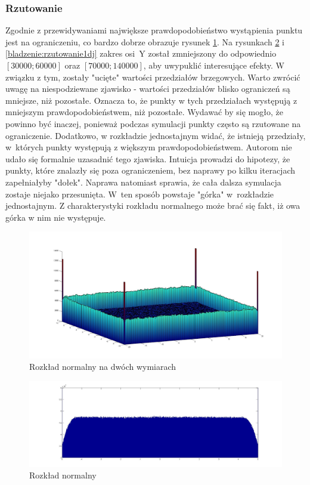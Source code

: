 \documentclass{mini}
\begin{document}
\subsubsection*{Rzutowanie}
Zgodnie z przewidywaniami największe prawdopodobieństwo wystąpienia punktu jest na ograniczeniu, co bardzo dobrze obrazuje rysunek \ref{bladzenie:rzutowanie2d}. Na rysunkach   \ref{bladzenie:rzutowanie1dn} i  \ref{bladzenie:rzutowanie1dj} zakres osi~Y został zmniejszony do odpowiednio $[30000;60000]$ oraz $[70000;140000]$, aby uwypuklić interesujące efekty. W związku z tym, zostały "ucięte" wartości przedziałów brzegowych. Warto zwrócić uwagę na niespodziewane zjawisko - wartości przedziałów blisko ograniczeń są mniejsze, niż pozostałe. Oznacza to, że punkty w tych przedziałach występują z mniejszym prawdopodobieństwem, niż pozostałe. Wydawać by się mogło, że powinno być inaczej, ponieważ podczas symulacji punkty często są rzutowane na ograniczenie. Dodatkowo, w rozkładzie jednostajnym widać, że istnieją przedziały, w~których punkty występują z większym prawdopodobieństwem. Autorom nie udało się formalnie uzasadnić tego zjawiska. Intuicja prowadzi do hipotezy, że punkty, które znalazły się poza ograniczeniem, bez naprawy po kilku iteracjach zapełniałyby "dołek". Naprawa natomiast sprawia, że cała dalsza symulacja zostaje niejako przesunięta. W~ten sposób powstaje "górka" w~rozkładzie jednostajnym. Z charakterystyki rozkładu normalnego może brać się fakt, iż owa górka w nim nie występuje.

\begin{figure}[H]
\centering
\includegraphics[width=\textwidth]{p_n_10M_2__20_20__10_10_4_2}
\caption{Rozkład normalny na dwóch wymiarach}
\label{bladzenie:rzutowanie2d}
\end{figure}

\begin{figure}[H]
\centering
\includegraphics[width=\textwidth]{p_n_50M_1__5_5}
\caption{Rozkład normalny}
\label{bladzenie:rzutowanie1dn}
\end{figure}
\end{document}
